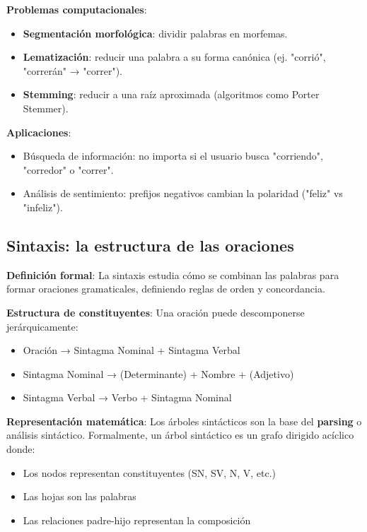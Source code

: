 \documentclass[12pt,a4paper,openany,oneside]{book}
\begin{document}
\textbf{Problemas computacionales}:
\begin{itemize}
    \item \textbf{Segmentación morfológica}: dividir palabras en morfemas.
    \item \textbf{Lematización}: reducir una palabra a su forma canónica (ej. "corrió", "correrán" → "correr").
    \item \textbf{Stemming}: reducir a una raíz aproximada (algoritmos como Porter Stemmer).
\end{itemize}

\textbf{Aplicaciones}:
\begin{itemize}
    \item Búsqueda de información: no importa si el usuario busca "corriendo", "corredor" o "correr".
    \item Análisis de sentimiento: prefijos negativos cambian la polaridad ("feliz" vs "infeliz").
\end{itemize}

\subsection{Sintaxis: la estructura de las oraciones}
\textbf{Definición formal}: La sintaxis estudia cómo se combinan las palabras para formar oraciones gramaticales, definiendo reglas de orden y concordancia.

\textbf{Estructura de constituyentes}: Una oración puede descomponerse jerárquicamente:
\begin{itemize}
    \item Oración → Sintagma Nominal + Sintagma Verbal
    \item Sintagma Nominal → (Determinante) + Nombre + (Adjetivo)
    \item Sintagma Verbal → Verbo + Sintagma Nominal
\end{itemize}

\textbf{Representación matemática}: Los árboles sintácticos son la base del \textbf{parsing} o análisis sintáctico. Formalmente, un árbol sintáctico es un grafo dirigido acíclico donde:
\begin{itemize}
    \item Los nodos representan constituyentes (SN, SV, N, V, etc.)
    \item Las hojas son las palabras
    \item Las relaciones padre-hijo representan la composición
\end{itemize}
\end{document}
